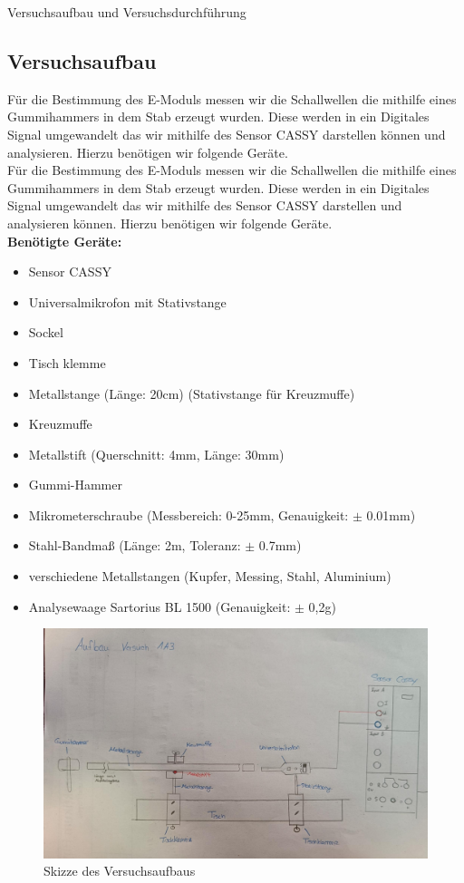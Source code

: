 \documentclass[twoside]{protokoll}
\begin{document}
\begin{aufgabe}{Versuchsaufbau und Versuchsdurchführung}
\subsection{Versuchsaufbau}
  Für die Bestimmung des E-Moduls messen wir die Schallwellen die mithilfe eines Gummihammers in dem Stab erzeugt wurden.
    Diese werden in ein Digitales Signal umgewandelt das wir mithilfe des Sensor CASSY darstellen können und analysieren.
    Hierzu benötigen wir folgende Geräte.\\

    Für die Bestimmung des E-Moduls messen wir die Schallwellen die mithilfe eines Gummihammers in dem Stab erzeugt wurden.
    Diese werden in ein Digitales Signal umgewandelt das wir mithilfe des Sensor CASSY darstellen und analysieren können.
    Hierzu benötigen wir folgende Geräte.\\

\textbf{Benötigte Geräte:}
\begin{itemize}
\item Sensor CASSY
\item Universalmikrofon mit Stativstange
\item Sockel
\item Tisch klemme
\item Metallstange (Länge: 20cm) (Stativstange für Kreuzmuffe)
\item Kreuzmuffe
\item Metallstift (Querschnitt: 4mm, Länge: 30mm)
\item Gummi-Hammer
\item Mikrometerschraube (Messbereich: 0-25mm, Genauigkeit: $\pm$ 0.01mm)
\item Stahl-Bandmaß (Länge: 2m, Toleranz: $\pm$ 0.7mm)
\item verschiedene Metallstangen (Kupfer, Messing, Stahl, Aluminium)
\item Analysewaage Sartorius BL 1500 (Genauigkeit: $\pm$ 0,2g)
\end{itemize}


\begin{figure}[H]
  \centering
  \includegraphics[width=1\textwidth]{Bilder/434170_428396_1A3_SkizzeAufbau.pdf}
  \caption{Skizze des Versuchsaufbaus}
  \centering
\end{figure}
 

\end{aufgabe}
\end{document}
